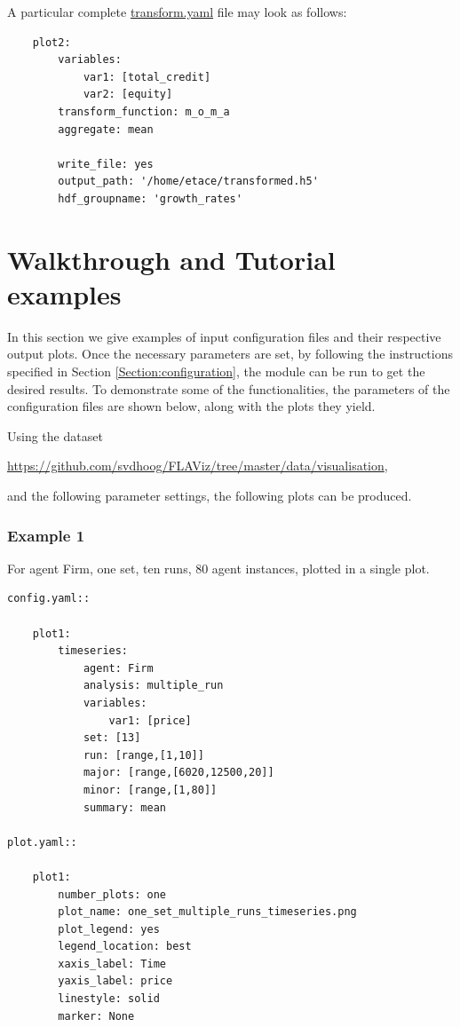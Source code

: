 \documentclass[10pt,a4paper]{article}
\begin{document}
A particular complete \url{transform.yaml} file may look as follows:
\begin{lstlisting}
    plot2:
        variables: 
            var1: [total_credit]
            var2: [equity]       
        transform_function: m_o_m_a
        aggregate: mean    
     
        write_file: yes
        output_path: '/home/etace/transformed.h5'
        hdf_groupname: 'growth_rates'
\end{lstlisting}


\clearpage
\section{Walkthrough and Tutorial examples}


In this section we give examples of input configuration files and their respective output plots.
Once the necessary parameters are set, by following the instructions specified in Section \ref{Section:configuration}, the module can be run to get the desired results. To demonstrate some of the functionalities, the parameters of the configuration files are shown below, along with the plots they yield.

Using the dataset

 \url{https://github.com/svdhoog/FLAViz/tree/master/data/visualisation},
 
 and the following parameter settings, the following plots can be produced.

\clearpage
\subsubsection{Example 1}
For agent Firm, one set, ten runs, 80 agent instances, plotted in a single plot.

\begin{lstlisting}
config.yaml::

    plot1:
        timeseries:
            agent: Firm
            analysis: multiple_run
            variables:
                var1: [price]
            set: [13]
            run: [range,[1,10]]
            major: [range,[6020,12500,20]]
            minor: [range,[1,80]] 
            summary: mean

plot.yaml::

    plot1:
        number_plots: one
        plot_name: one_set_multiple_runs_timeseries.png
        plot_legend: yes
        legend_location: best
        xaxis_label: Time
        yaxis_label: price
        linestyle: solid
        marker: None
\end{lstlisting}
\end{document}
